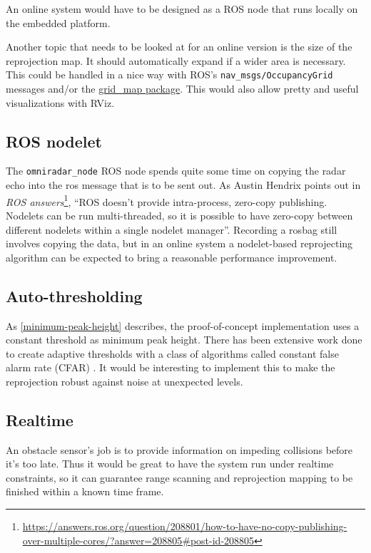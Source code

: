 An online system would have to be designed as a ROS node that
runs locally on the embedded platform.

Another topic that needs to be looked at for an online version is the
size of the reprojection map. It should automatically expand if a wider
area is necessary. This could be handled in a nice way with ROS's
\texttt{nav\_msgs/OccupancyGrid} messages and/or the
\href{http://wiki.ros.org/grid_map}{grid\_map package}. This would also
allow pretty and useful visualizations with RViz.

\subsection{ROS nodelet}\label{ros-nodelet}

The \texttt{omniradar\_node} ROS node spends quite some time on copying
the radar echo into the ros message that is to be sent out. As Austin
Hendrix points out in \textit{ROS answers}\footnote{\url{https://answers.ros.org/question/208801/how-to-have-no-copy-publishing-over-multiple-cores/?answer=208805\#post-id-208805}}, ``ROS doesn't provide intra-process, zero-copy publishing.
Nodelets can be run multi-threaded, so it is possible to have zero-copy
between different nodelets within a single nodelet manager''. Recording
a rosbag still involves copying the data, but in an online system a
nodelet-based reprojecting algorithm can be expected to bring a
reasonable performance improvement.

\subsection{Auto-thresholding}\label{auto-thresholding}

As \cref{minimum-peak-height} describes, the proof-of-concept implementation uses a constant threshold as minimum peak height. There has been extensive work done to create adaptive thresholds with a class of algorithms called constant false alarm rate (CFAR) \cite{Skolnik2008,Adams2012}. It would be interesting to implement this to make the reprojection robust against noise at unexpected levels.

\subsection{Realtime}\label{realtime}

An obstacle sensor's job is to provide information on impeding
collisions before it's too late. Thus it would be great to have the
system run under realtime constraints, so it can guarantee range
scanning and reprojection mapping to be finished within a known time
frame.

